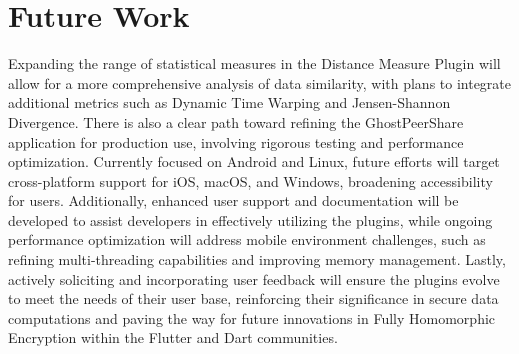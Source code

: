 \section{Future Work}
Expanding the range of statistical measures in the Distance Measure Plugin will allow for a more comprehensive analysis of data similarity, with plans to integrate additional metrics such as Dynamic Time Warping and Jensen-Shannon Divergence.
There is also a clear path toward refining the GhostPeerShare application for production use, involving rigorous testing and performance optimization. Currently focused on Android and Linux, future efforts will target cross-platform support for iOS, macOS, and Windows, broadening accessibility for users. Additionally, enhanced user support and documentation will be developed to assist developers in effectively utilizing the plugins, while ongoing performance optimization will address mobile environment challenges, such as refining multi-threading capabilities and improving memory management. Lastly, actively soliciting and incorporating user feedback will ensure the plugins evolve to meet the needs of their user base, reinforcing their significance in secure data computations and paving the way for future innovations in Fully Homomorphic Encryption within the Flutter and Dart communities.
